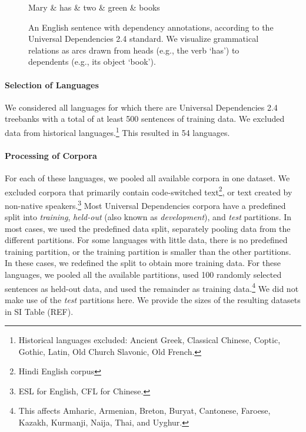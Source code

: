 \begin{figure}
\centering
\begin{dependency}[theme = simple]
   \begin{deptext}[column sep=1em]
Mary \&	 has \& two \& green \& books  \\
   \end{deptext}
\end{dependency}
	\caption{An English sentence with dependency annotations, according to the Universal Dependencies 2.4 standard.
	We visualize grammatical relations as arcs drawn from heads (e.g., the verb `has') to dependents (e.g., its object `book').
	}\label{fig:dependency}
\end{figure}

\paragraph{Selection of Languages}
We considered all languages for which there are Universal Dependencies 2.4 treebanks with a total of at least 500 sentences of training data.
We excluded data from historical languages.\footnote{Historical languages excluded: Ancient Greek, Classical Chinese, Coptic, Gothic, Latin, Old Church Slavonic, Old French.}
This resulted in 54 languages.

\paragraph{Processing of Corpora}
For each of these languages, we pooled all available corpora in one dataset.
We excluded corpora that primarily contain code-switched text\footnote{Hindi English corpus}, or text created by non-native speakers.\footnote{ESL for English, CFL for Chinese.}
Most Universal Dependencies corpora have a predefined split into \emph{training}, \emph{held-out} (also known as \emph{development}), and \emph{test} partitions.
In most cases, we used the predefined data split, separately pooling data from the different partitions. 
For some languages with little data, there is no predefined training partition, or the training partition is smaller than the other partitions.
In these cases, we redefined the split to obtain more training data.
For these languages, we pooled all the available partitions, used 100 randomly selected sentences as held-out data, and used the remainder as training data.\footnote{This affects Amharic, Armenian, Breton, Buryat, Cantonese, Faroese, Kazakh, Kurmanji, Naija, Thai, and Uyghur.}
We did not make use of the \textit{test} partitions here.
We provide the sizes of the resulting datasets in SI Table (REF).

